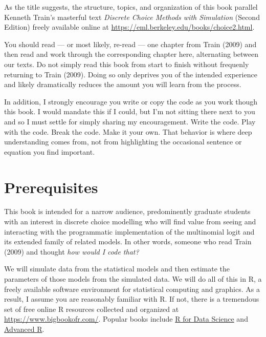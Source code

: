 \documentclass[
  letterpaper,
  DIV=11,
  numbers=noendperiod]{scrreprt}
\begin{document}

As the title suggests, the structure, topics, and organization of this
book parallel Kenneth Train's masterful text \emph{Discrete Choice
Methods with Simulation} (Second Edition) freely available online at
\url{https://eml.berkeley.edu/books/choice2.html}.

You should read --- or most likely, re-read --- one chapter from Train
(2009) and then read and work through the corresponding chapter here,
alternating between our texts. Do not simply read this book from start
to finish without frequenly returning to Train (2009). Doing so only
deprives you of the intended experience and likely dramatically reduces
the amount you will learn from the process.

In addition, I strongly encourage you write or copy the code as you work
though this book. I would mandate this if I could, but I'm not sitting
there next to you and so I must settle for simply sharing my
encouragement. Write the code. Play with the code. Break the code. Make
it your own. That behavior is where deep understanding comes from, not
from highlighting the occasional sentence or equation you find
important.

\section*{Prerequisites}\label{prerequisites}


This book is intended for a narrow audience, predominently graduate
students with an interest in discrete choice modelling who will find
value from seeing and interacting with the programmatic implementation
of the multinomial logit and its extended family of related models. In
other words, someone who read Train (2009) and thought \emph{how would I
code that?}

We will simulate data from the statistical models and then estimate the
parameters of those models from the simulated data. We will do all of
this in R, a freely available software environment for statistical
computing and graphics. As a result, I assume you are reasonably
familiar with R. If not, there is a tremendous set of free online R
resources collected and organized at \url{https://www.bigbookofr.com/}.
Popular books include \href{https://r4ds.hadley.nz/}{R for Data Science}
and \href{https://adv-r.hadley.nz/}{Advanced R}.
\end{document}

